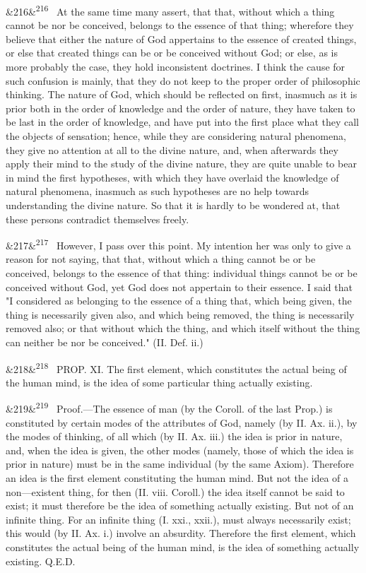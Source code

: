 \documentclass[12pt]{article}
\newcommand{\para}[1][]{\par\noindent\ifx&#1&\else\textsuperscript{\footnotesize #1}~\fi}
\begin{document}
\para[216] At the same time many assert, that that, without which a thing cannot be nor be conceived, belongs to the essence of that thing; wherefore they believe that either the nature of God appertains to the essence of created things, or else that created things can be or be conceived without God; or else, as is more probably the case, they hold inconsistent doctrines. I think the cause for such confusion is mainly, that they do not keep to the proper order of philosophic thinking. The nature of God, which should be reflected on first, inasmuch as it is prior both in the order of knowledge and the order of nature, they have taken to be last in the order of knowledge, and have put into the first place what they call the objects of sensation; hence, while they are considering natural phenomena, they give no attention at all to the divine nature, and, when afterwards they apply their mind to the study of the divine nature, they are quite unable to bear in mind the first hypotheses, with which they have overlaid the knowledge of natural phenomena, inasmuch as such hypotheses are no help towards understanding the divine nature. So that it is hardly to be wondered at, that these persons contradict themselves freely.

\para[217] However, I pass over this point. My intention her was only to give a reason for not saying, that that, without which a thing cannot be or be conceived, belongs to the essence of that thing: individual things cannot be or be conceived without God, yet God does not appertain to their essence. I said that "I considered as belonging to the essence of a thing that, which being given, the thing is necessarily given also, and which being removed, the thing is necessarily removed also; or that without which the thing, and which itself without the thing can neither be nor be conceived." (II. Def. ii.)

\para[218] PROP. XI. The first element, which constitutes the actual being of the human mind, is the idea of some particular thing actually existing.

\para[219] Proof.---The essence of man (by the Coroll. of the last Prop.) is constituted by certain modes of the attributes of God, namely (by II. Ax. ii.), by the modes of thinking, of all which (by II. Ax. iii.) the idea is prior in nature, and, when the idea is given, the other modes (namely, those of which the idea is prior in nature) must be in the same individual (by the same Axiom). Therefore an idea is the first element constituting the human mind. But not the idea of a non---existent thing, for then (II. viii. Coroll.) the idea itself cannot be said to exist; it must therefore be the idea of something actually existing. But not of an infinite thing. For an infinite thing (I. xxi., xxii.), must always necessarily exist; this would (by II. Ax. i.) involve an absurdity. Therefore the first element, which constitutes the actual being of the human mind, is the idea of something actually existing. Q.E.D.
\end{document}
